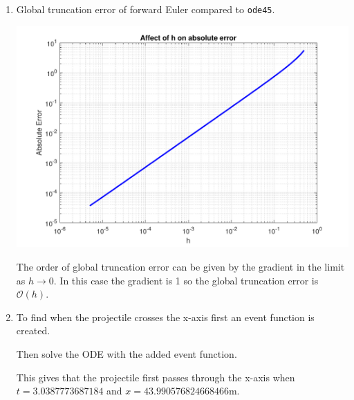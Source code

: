\documentclass[a4paper,11pt]{article}
\newcommand{\order}{\mathcal{O}}
\begin{document}
\begin{enumerate}
	
	\item Global truncation error of forward Euler compared to \verb*|ode45|.
	\begin{center}
		\includegraphics[scale=0.7]{images/Q3d.pdf}
	\end{center}
	The order of global truncation error can be given by the gradient in the 
	limit as $h \xrightarrow{} 0$. In this case the gradient is 1 so the 
	global truncation error is $\order(h)$.
	
	\item To find when the projectile crosses the x-axis first an event 
	function is created.
	
	Then solve the ODE with the added event function.
	
	This gives that the projectile first passes through the x-axis when 
	$t=3.0387773687184$ and $x=43.990576824668466$m.
	

\end{enumerate}
\end{document}
